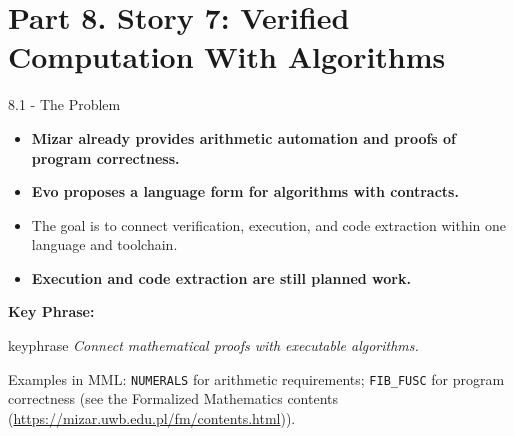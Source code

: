 \documentclass[aspectratio=169,11pt]{beamer}
\begin{document}
\section{Part 8. Story 7: Verified Computation With Algorithms}
\begin{frame}[fragile,t]{8.1 - The Problem}
\begin{itemize}
\setlength{\itemsep}{1pt}
\setlength{\parsep}{0pt}
\setlength{\parskip}{0pt}
\item \textcolor{blue!55!black}{\textbf{Mizar already provides arithmetic automation and proofs of program correctness.}}
\item \textcolor{blue!55!black}{\textbf{Evo proposes a language form for algorithms with contracts.}}
\item The goal is to connect verification, execution, and code extraction within one language and toolchain.
\item \textcolor{blue!55!black}{\textbf{Execution and code extraction are still planned work.}}
\end{itemize}
\smallskip
\textbf{Key Phrase:}
\begin{center}
\begin{beamercolorbox}[rounded=true,sep=2.5mm,wd=0.9\textwidth]{keyphrase}
\centering\itshape Connect mathematical proofs with executable algorithms.
\end{beamercolorbox}
\end{center}
Examples in MML: \texttt{NUMERALS} for arithmetic requirements; \texttt{FIB\_FUSC} for program correctness (see the Formalized Mathematics contents (\url{https://mizar.uwb.edu.pl/fm/contents.html})).

\end{frame}
\end{document}
